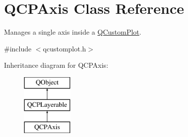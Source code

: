 \hypertarget{class_q_c_p_axis}{}\section{Q\+C\+P\+Axis Class Reference}
\label{class_q_c_p_axis}


Manages a single axis inside a \hyperlink{class_q_custom_plot}{Q\+Custom\+Plot}.  




{\ttfamily \#include $<$qcustomplot.\+h$>$}

Inheritance diagram for Q\+C\+P\+Axis\+:\begin{figure}[H]
\begin{center}
\leavevmode
\includegraphics[height=3.000000cm]{class_q_c_p_axis}
\end{center}
\end{figure}
